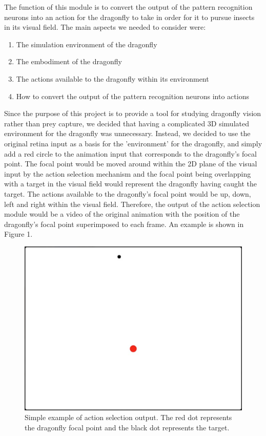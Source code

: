 \documentclass[a4paper,11pt]{article}
\begin{document}
The function of this module is to convert the output of the pattern recognition neurons into an action for the dragonfly to take in order for it to pursue insects in its visual field.
The main aspects we needed to consider were:
\begin{enumerate}
	\item The simulation environment of the dragonfly
	\item The embodiment of the dragonfly
	\item The actions available to the dragonfly within its environment
	\item How to convert the output of the pattern recognition neurons into actions
\end{enumerate}
Since the purpose of this project is to provide a tool for studying dragonfly vision rather than prey capture, we decided that having a complicated 3D simulated environment for the dragonfly was unnecessary. Instead, we decided to use the original retina input as a basis for the 'environment' for the dragonfly, and simply add a red circle to the animation input that corresponds to the dragonfly's focal point. The focal point would be moved around within the 2D plane of the visual input by the action selection mechanism and the focal point being overlapping with a target in the visual field would represent the dragonfly having caught the target. The actions available to the dragonfly's focal point would be up, down, left and right within the visual field. Therefore, the output of the action selection module would be a video of the original animation with the position of the dragonfly's focal point superimposed to each frame. An example is shown in Figure 1.

\begin{figure}[hb]
\centering
\includegraphics[scale = 0.3]{as_example}
\caption{Simple example of action selection output. The red dot represents the dragonfly focal point and the black dot represents the target.}
\end{figure}
\end{document}
